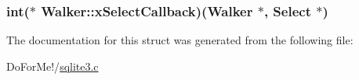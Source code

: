 \hypertarget{struct_walker_a2850c95c634f9439bb403f0bb211c636}{
\subsubsection[{x\-Select\-Callback}]{\setlength{\rightskip}{0pt plus 5cm}int($\ast$ Walker\-::x\-Select\-Callback)({\bf Walker} $\ast$, {\bf Select} $\ast$)}}\label{struct_walker_a2850c95c634f9439bb403f0bb211c636}


The documentation for this struct was generated from the following file\-:\begin{DoxyCompactItemize}
\item 
Do\-For\-Me!/\hyperlink{sqlite3_8c}{sqlite3.\-c}\end{DoxyCompactItemize}
